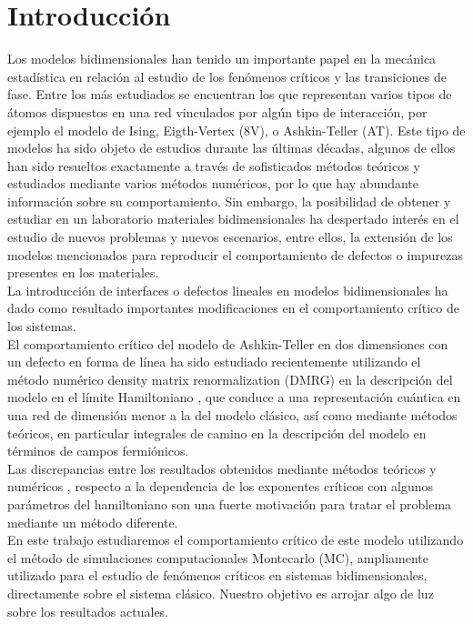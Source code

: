 
\section{Introducci\'on}
\label{sec:intro}
Los modelos bidimensionales han tenido un importante papel en la mec\'anica estad\'istica en relaci\'on al estudio de los
 fen\'omenos cr\'iticos y las transiciones de fase. Entre los más estudiados se encuentran los que representan
 varios tipos de átomos dispuestos en una red vinculados por algún tipo de interacción, por ejemplo el modelo de Ising, Eigth-Vertex (8V)\cite{model_8V},
 o Ashkin-Teller (AT)\cite{ashkin_teller_43}. Este tipo de modelos ha sido objeto de estudios durante las últimas décadas,
 algunos de ellos han sido resueltos exactamente a través de sofisticados métodos teóricos y estudiados mediante varios
 métodos numéricos, por lo que hay abundante información sobre su comportamiento. Sin embargo, la posibilidad de obtener y estudiar en un laboratorio
 materiales bidimensionales \cite{exp_ultrathin_magfilms} ha despertado interés en el estudio de nuevos problemas y nuevos escenarios,
 entre ellos, la extensión de los modelos mencionados para
 reproducir el comportamiento de defectos o impurezas presentes en los materiales.\\
La introducción de interfaces o defectos lineales en modelos bidimensionales \cite{linear_defects2D, interf, interf_AT} ha dado como resultado importantes
 modificaciones en el comportamiento crítico de los sistemas.\\
El comportamiento crítico del modelo de Ashkin-Teller en dos dimensiones con un defecto en forma de línea ha sido estudiado
 recientemente utilizando el método numérico density matrix renormalization (DMRG) en la descripción del modelo en el límite Hamiltoniano \cite{AT_lajko},
 que conduce a una representación cuántica en una red de dimensión menor a la del modelo clásico, así como mediante métodos teóricos, en particular integrales de camino
 en la descripción del modelo en términos de campos fermiónicos\cite{AT_naon}.\\
Las discrepancias entre los resultados obtenidos mediante métodos teóricos y numéricos , respecto a la dependencia de los exponentes críticos con algunos parámetros
 del hamiltoniano son una fuerte motivación para tratar el problema mediante un método diferente.\\
En este trabajo estudiaremos el comportamiento crítico de este modelo utilizando el método de simulaciones computacionales Montecarlo (MC), ampliamente utilizado
 para el estudio de fenómenos críticos en sistemas bidimensionales, directamente sobre el sistema clásico. Nuestro objetivo es arrojar algo de luz sobre los
 resultados actuales.\\
